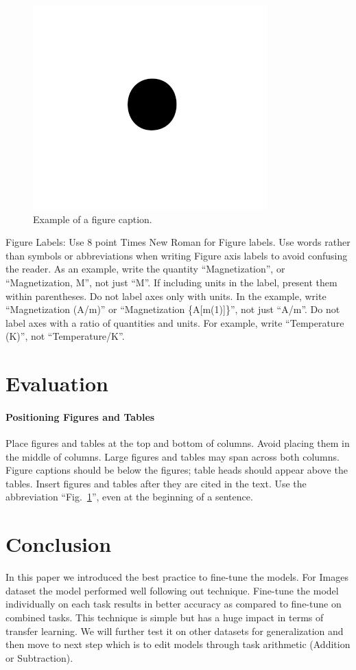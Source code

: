 \documentclass[conference]{IEEEtran}
\begin{document}
\begin{figure}[htbp]
\centerline{\includegraphics{fig1.png}}
\caption{Example of a figure caption.}
\label{fig}
\end{figure}

Figure Labels: Use 8 point Times New Roman for Figure labels. Use words 
rather than symbols or abbreviations when writing Figure axis labels to 
avoid confusing the reader. As an example, write the quantity 
``Magnetization'', or ``Magnetization, M'', not just ``M''. If including 
units in the label, present them within parentheses. Do not label axes only 
with units. In the example, write ``Magnetization (A/m)'' or ``Magnetization 
\{A[m(1)]\}'', not just ``A/m''. Do not label axes with a ratio of 
quantities and units. For example, write ``Temperature (K)'', not 
``Temperature/K''.

\section{Evaluation}
\paragraph{Positioning Figures and Tables} Place figures and tables at the top and 
bottom of columns. Avoid placing them in the middle of columns. Large 
figures and tables may span across both columns. Figure captions should be 
below the figures; table heads should appear above the tables. Insert 
figures and tables after they are cited in the text. Use the abbreviation 
``Fig.~\ref{fig}'', even at the beginning of a sentence.

\section{Conclusion}
In this paper we introduced the best practice to fine-tune the models. For Images dataset the model performed well following out technique. Fine-tune the model individually on each task results in better accuracy as compared to fine-tune on combined tasks. This technique is simple but has a huge impact in terms of transfer learning. We will further test it on other datasets for generalization and then move to next step which is to edit models through task arithmetic (Addition or Subtraction).
\end{document}
